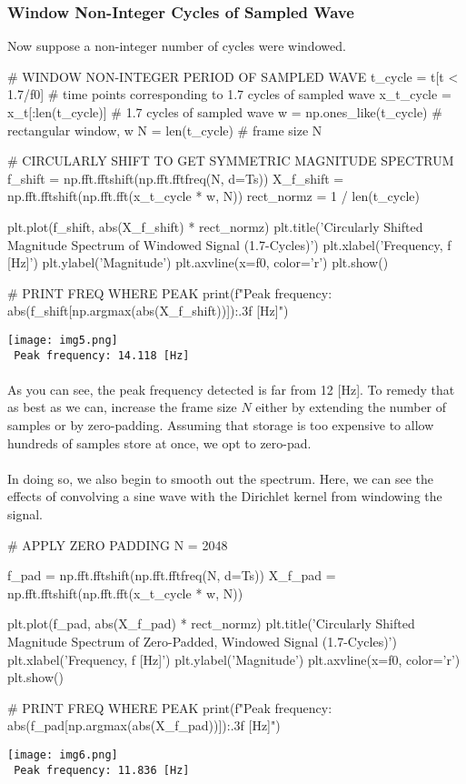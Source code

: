 \documentclass{report}
\begin{document}
\subsubsection{Window Non-Integer Cycles of Sampled Wave}
Now suppose a non-integer number of cycles were windowed. 
\begin{python}
# WINDOW NON-INTEGER PERIOD OF SAMPLED WAVE
t_cycle = t[t < 1.7/f0]                # time points corresponding to 1.7 cycles of sampled wave
x_t_cycle = x_t[:len(t_cycle)]         # 1.7 cycles of sampled wave
w = np.ones_like(t_cycle)              # rectangular window, w
N = len(t_cycle)                       # frame size N

# CIRCULARLY SHIFT TO GET SYMMETRIC MAGNITUDE SPECTRUM
f_shift = np.fft.fftshift(np.fft.fftfreq(N, d=Ts))
X_f_shift = np.fft.fftshift(np.fft.fft(x_t_cycle * w, N))
rect_normz = 1 / len(t_cycle)          

plt.plot(f_shift, abs(X_f_shift) * rect_normz)
plt.title('Circularly Shifted Magnitude Spectrum of \n Windowed Signal (1.7-Cycles)')
plt.xlabel('Frequency, f [Hz]')
plt.ylabel('Magnitude')
plt.axvline(x=f0, color='r')
plt.show()

# PRINT FREQ WHERE PEAK
print(f"Peak frequency: {abs(f_shift[np.argmax(abs(X_f_shift))]):.3f} [Hz]")
\end{python}
\texttt{[image: img5.png]} \\ 
\texttt{ Peak frequency: 14.118 [Hz]}
\\ \\
As you can see, the peak frequency detected is far from 12 [Hz]. To remedy that as best as we can, increase the frame size $N$ either by extending the number of samples or by zero-padding. 
Assuming that storage is too expensive to allow hundreds of samples store at once, we opt to zero-pad. 
\\ \\
In doing so, we also begin to smooth out the spectrum. Here, we can see the effects of 
convolving a sine wave with the Dirichlet kernel from windowing the signal.
\begin{python}
# APPLY ZERO PADDING
N = 2048

f_pad = np.fft.fftshift(np.fft.fftfreq(N, d=Ts))
X_f_pad = np.fft.fftshift(np.fft.fft(x_t_cycle * w, N))

plt.plot(f_pad, abs(X_f_pad) * rect_normz)
plt.title('Circularly Shifted Magnitude Spectrum of \n Zero-Padded, Windowed Signal (1.7-Cycles)')
plt.xlabel('Frequency, f [Hz]')
plt.ylabel('Magnitude')
plt.axvline(x=f0, color='r')
plt.show()

# PRINT FREQ WHERE PEAK
print(f"Peak frequency: {abs(f_pad[np.argmax(abs(X_f_pad))]):.3f} [Hz]")
\end{python}
\texttt{[image: img6.png]} \\ 
\texttt{ Peak frequency: 11.836 [Hz]}
\end{document}
